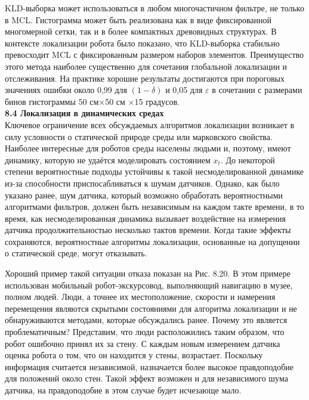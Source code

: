 \documentclass[10pt,a4paper]{article}
\begin{document}
KLD-выборка может использоваться в любом многочастичном фильтре, не только в MCL. Гистограмма может быть реализована как в виде фиксированной многомерной сетки, так и в более компактных древовидных структурах. В контексте локализации робота было показано, что KLD-выборка стабильно превосходит MCL с фиксированным размером наборов элементов. Преимущество этого метода наиболее существенно для сочетания глобальной локализации и отслеживания. На практике хорошие результаты достигаются при пороговых значениях ошибки около 0,99 для $(1-\delta)$ и 0,05 для $\varepsilon$ в сочетании с размерами бинов гистограммы  50 см$\times$50 см $\times$15 градусов.\\

\textbf{8.4	Локализация в динамических средах}\\

Ключевое ограничение всех обсуждаемых алгоритмов локализации возникает в силу условности о статической природе среды или марковского свойства. Наиболее интересные для роботов среды населены людьми и, поэтому, имеют динамику, которую не удаётся моделировать состоянием $x_t$. До некоторой степени вероятностные подходы устойчивы к такой несмоделированной динамике из-за способности приспосабливаться к шумам датчиков. Однако, как было указано ранее, шум датчика, который возможно обработать вероятностными алгоритмами фильтров, должен быть независимым на каждом такте времени, в то время, как несмоделированная динамика вызывает воздействие на измерения датчика продолжительностью несколько тактов времени. Когда такие эффекты сохраняются, вероятностные алгоритмы локализации, основанные на допущении о статической среде, могут отказывать. 

Хороший пример такой ситуации отказа показан на Рис. 8.20. В этом примере использован мобильный робот-экскурсовод, выполняющий навигацию в музее, полном людей. Люди, а точнее их местоположение, скорости и намерения перемещения являются скрытыми состояниями для алгоритма локализации и не обнаруживаются методами, которые обсуждались ранее. Почему это является проблематичным? Представим, что люди расположились таким образом, что робот ошибочно принял их за стену. С каждым новым измерением датчика оценка робота о том, что он находится у стены, возрастает. Поскольку информация считается независимой, назначается более высокое правдоподобие для положений около стен. Такой эффект возможен и для независимого шума датчика, на правдоподобие в этом случае будет исчезающе мало.
\end{document}
